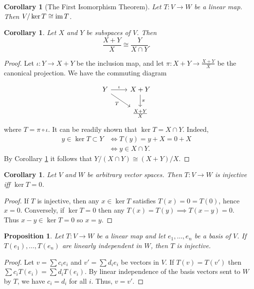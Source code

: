 \documentclass[12pt]{article}
\theoremstyle{definition}
\theoremstyle{plain}
\newtheorem{proposition}[theorem] {Proposition}
\newtheorem{corollary}[theorem]{Corollary}
\numberwithin{equation}{section}
\theoremstyle{definition}
\begin{document}
\begin{corollary}[The First Isomorphism Theorem] \label{iso1}
Let $ T : V \to W $ be a linear map. Then $ V / \ker T \cong \operatorname{im} T $.
\end{corollary}

\begin{corollary} \label{iso2}
Let $ X$ and $ Y $ be subspaces of $ V $. Then
\[ \frac{X+ Y}{X} \cong \frac{Y}{X \cap Y}. \]
\end{corollary}

\begin{proof}
Let $ \iota : Y \to X + Y $ be the inclusion map, and let $ \pi : X + Y \to \frac{X+ Y}{X} $ be the canonical projection. We have the commuting diagram

\[\begin{tikzcd}
	Y \arrow[dr, "T"'] \arrow[r, "\iota"] & X + Y \arrow[d, "\pi"]\\
						 & \frac{X+Y}{X}
\end{tikzcd}\]
where $ T = \pi \circ \iota $. It can be readily shown that $ \ker T = X \cap Y $. Indeed, 
\begin{align*}
	y \in \ker T \subset Y &\iff T(y) = y + X = 0 + X\\
	&\iff y \in X \cap Y.
\end{align*}
By Corollary \ref{iso1} it follows that $ Y / (X \cap Y) \cong (X + Y) / X $.
\end{proof}

\begin{corollary} \label{inj_eqv}
Let $ V $ and $ W $ be arbitrary vector spaces. Then $ T : V \to W $ is injective iff $ \ker T = 0 $.
\end{corollary}

\begin{proof}
If $ T $ is injective, then any $ x \in \ker T $ satisfies $ T(x) = 0 = T(0) $, hence $ x = 0 $. Conversely, if $ \ker T = 0 $ then any $ T(x) = T(y) \implies T(x - y) = 0$. Thus $ x - y \in \ker T = 0 $ so $ x = y $.
\end{proof}

\begin{proposition} \label{indp_inj}
Let $ T : V \to W $ be a linear map and let $ e_1, \ldots, e_n $ be a basis of $ V $. If $ T(e_1), \ldots, T(e_n) $ are linearly independent in $ W $, then $ T $ is injective.
\end{proposition}

\begin{proof}
Let $ v = \sum c_i e_i $ and $ v' = \sum d_i e_i $ be vectors in $ V $. If $ T(v) = T(v') $ then $ \sum c_i T(e_i) = \sum d_i T(e_i) $. By linear independence of the basis vectors sent to $ W $ by $ T $, we have $ c_i = d_i $ for all $ i $. Thus, $ v = v' $.
\end{proof}
\end{document}
